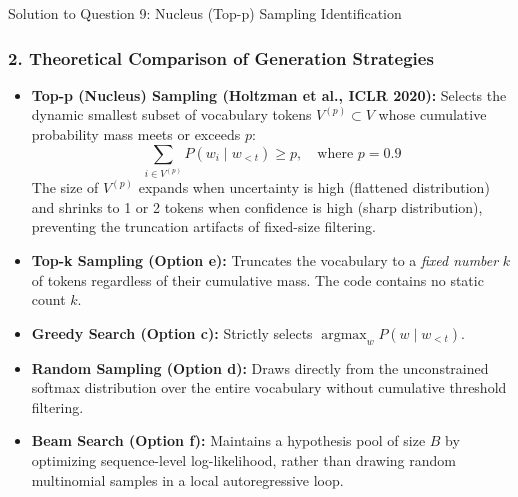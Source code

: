 \documentclass[11pt,a4paper]{article}
\begin{document}
\begin{solutionbox}{Solution to Question 9: Nucleus (Top-p) Sampling Identification}
\subsubsection*{2. Theoretical Comparison of Generation Strategies}
\begin{itemize}[itemsep=2pt]
    \item \textbf{Top-p (Nucleus) Sampling (Holtzman et al., ICLR 2020):}
    Selects the dynamic smallest subset of vocabulary tokens $V^{(p)} \subset V$ whose cumulative probability mass meets or exceeds $p$:
    \begin{equation}
        \sum_{i \in V^{(p)}} P(w_i \mid w_{<t}) \ge p, \quad \text{where } p = 0.9
    \end{equation}
    The size of $V^{(p)}$ expands when uncertainty is high (flattened distribution) and shrinks to 1 or 2 tokens when confidence is high (sharp distribution), preventing the truncation artifacts of fixed-size filtering.
    \item \textbf{Top-k Sampling (Option e):} Truncates the vocabulary to a \textit{fixed number} $k$ of tokens regardless of their cumulative mass. The code contains no static count $k$.
    \item \textbf{Greedy Search (Option c):} Strictly selects $\operatorname{argmax}_{w} P(w \mid w_{<t})$.
    \item \textbf{Random Sampling (Option d):} Draws directly from the unconstrained softmax distribution over the entire vocabulary without cumulative threshold filtering.
    \item \textbf{Beam Search (Option f):} Maintains a hypothesis pool of size $B$ by optimizing sequence-level log-likelihood, rather than drawing random multinomial samples in a local autoregressive loop.
\end{itemize}
\end{solutionbox}

\vspace{10pt}
\end{document}
